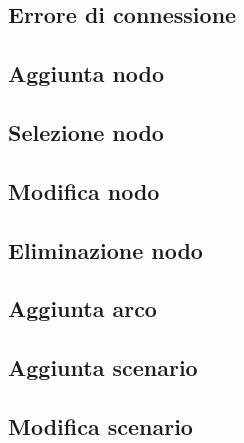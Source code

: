 \newpage
\subsection{Errore di connessione}
\label{9_Errore_grave}


\newpage
\subsection{Aggiunta nodo}
\label{12_Aggiunta_nodo}


\newpage
\subsection{Selezione nodo}
\label{13_Seleziona_nodo}


\newpage
\subsection{Modifica nodo}
\label{14_Modifica_nodo}

\newpage
\subsection{Eliminazione nodo}
\label{16_Eliminanodo}

\newpage
\subsection{Aggiunta arco}
\label{18_Aggiunta_arco_dati}


\newpage
\subsection{Aggiunta scenario}
\label{20_Aggiunta_scenario}


\newpage
\subsection{Modifica scenario}
\label{21_Modifica_scenario}
